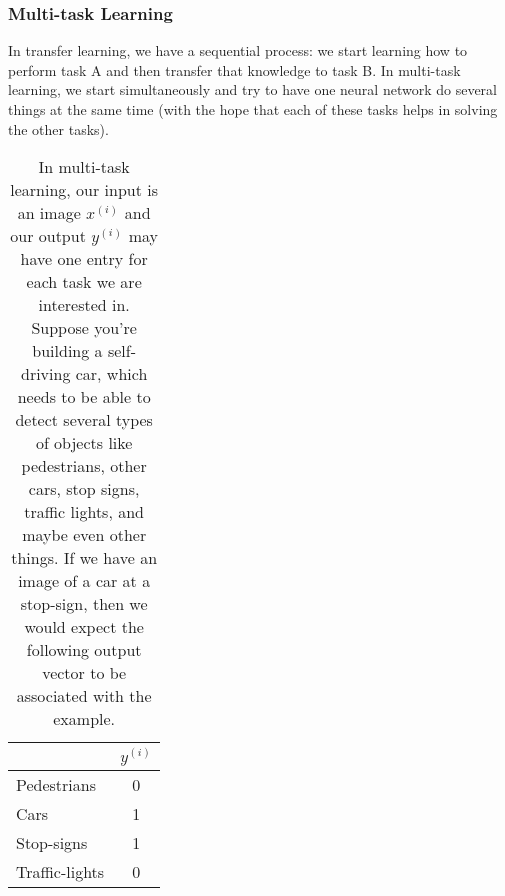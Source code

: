 \documentclass[12pt]{article}
\begin{document}
\subsubsection{Multi-task Learning} In transfer learning, we have a sequential process: we start learning how to perform task A
and then transfer that knowledge to task B. In multi-task learning, we start simultaneously and try to have one neural network do several things at the same time (with the hope that each of these tasks helps in solving the other tasks).
\begin{table}[h]
  \centering
  \begin{tabular}{l | c}     & $y^{(i)}$ \\
    \hline
    Pedestrians & 0 \\
    Cars & 1 \\
    Stop-signs & 1 \\
    Traffic-lights & 0     \end{tabular}
\caption{\footnotesize In multi-task learning, our input is an image $x^{(i)}$ and our output
  $y^{(i)}$ may have one entry for each task we are interested in. Suppose you're building a self-driving car, which needs to be able to detect several types of objects like pedestrians, other cars, stop signs, traffic lights,
and maybe even other things.
 If we have an image of a car at a stop-sign, then we would
  expect the following output vector to be associated with the example.} 
\end{table} 
\end{document}
